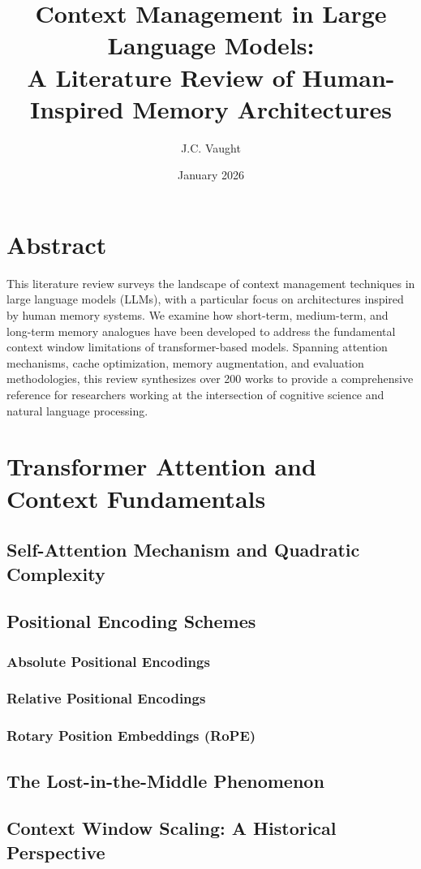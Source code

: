 \documentclass[12pt, letterpaper]{article}
\title{\textbf{Context Management in Large Language Models:\\A Literature Review of Human-Inspired Memory Architectures}}
\author{J.C. Vaught}
\date{January 2026}
\begin{document}
\maketitle
\tableofcontents
\newpage

\section*{Abstract}
This literature review surveys the landscape of context management techniques in large language models (LLMs), with a particular focus on architectures inspired by human memory systems. We examine how short-term, medium-term, and long-term memory analogues have been developed to address the fundamental context window limitations of transformer-based models. Spanning attention mechanisms, cache optimization, memory augmentation, and evaluation methodologies, this review synthesizes over 200 works to provide a comprehensive reference for researchers working at the intersection of cognitive science and natural language processing.

\section{Transformer Attention and Context Fundamentals}
\subsection{Self-Attention Mechanism and Quadratic Complexity}
\subsection{Positional Encoding Schemes}
\subsubsection{Absolute Positional Encodings}
\subsubsection{Relative Positional Encodings}
\subsubsection{Rotary Position Embeddings (RoPE)}
\subsection{The Lost-in-the-Middle Phenomenon}
\subsection{Context Window Scaling: A Historical Perspective}
\end{document}
